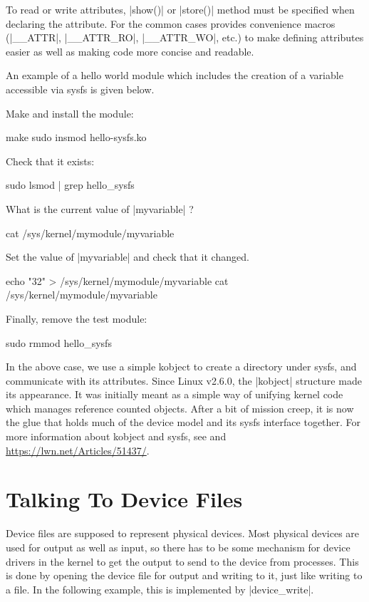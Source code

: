 \documentclass[10pt, oneside]{book}
\begin{document}
To read or write attributes, \cpp|show()| or \cpp|store()| method must be specified when declaring the attribute.
For the common cases  provides convenience macros (\cpp|__ATTR|, \cpp|__ATTR_RO|, \cpp|__ATTR_WO|, etc.) to make defining attributes easier as well as making code more concise and readable.

An example of a hello world module which includes the creation of a variable accessible via sysfs is given below.


Make and install the module:

\begin{codebash}
make
sudo insmod hello-sysfs.ko
\end{codebash}

Check that it exists:

\begin{codebash}
sudo lsmod | grep hello_sysfs
\end{codebash}

What is the current value of \cpp|myvariable| ?

\begin{codebash}
cat /sys/kernel/mymodule/myvariable
\end{codebash}

Set the value of \cpp|myvariable| and check that it changed.

\begin{codebash}
echo "32" > /sys/kernel/mymodule/myvariable
cat /sys/kernel/mymodule/myvariable
\end{codebash}

Finally, remove the test module:

\begin{codebash}
sudo rmmod hello_sysfs
\end{codebash}

In the above case, we use a simple kobject to create a directory under sysfs, and communicate with its attributes.
Since Linux v2.6.0, the \cpp|kobject| structure made its appearance.
It was initially meant as a simple way of unifying kernel code which manages reference counted objects.
After a bit of mission creep, it is now the glue that holds much of the device model and its sysfs interface together.
For more information about kobject and sysfs, see  and \url{https://lwn.net/Articles/51437/}.

\section{Talking To Device Files}
\label{sec:device_files}
Device files are supposed to represent physical devices.
Most physical devices are used for output as well as input, so there has to be some mechanism for device drivers in the kernel to get the output to send to the device from processes.
This is done by opening the device file for output and writing to it, just like writing to a file.
In the following example, this is implemented by \cpp|device_write|.
\end{document}
